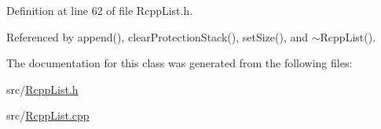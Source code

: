 Definition at line 62 of file RcppList.h.

Referenced by append(), clearProtectionStack(), setSize(), and $\sim$RcppList().

The documentation for this class was generated from the following files:\begin{DoxyCompactItemize}
\item 
src/\hyperlink{RcppList_8h}{RcppList.h}\item 
src/\hyperlink{RcppList_8cpp}{RcppList.cpp}\end{DoxyCompactItemize}
